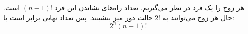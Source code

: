 \p   
هر زوج را یک فرد در نظر می‌گیریم. تعداد راه‌های نشاندن این فرد  
$(n-1)!$ است. حال هر زوج می‌توانند به 
$2!$ حالت دور میز بنشینند. پس تعداد نهایی برابر است با:
$${2^n}(n-1)!$$